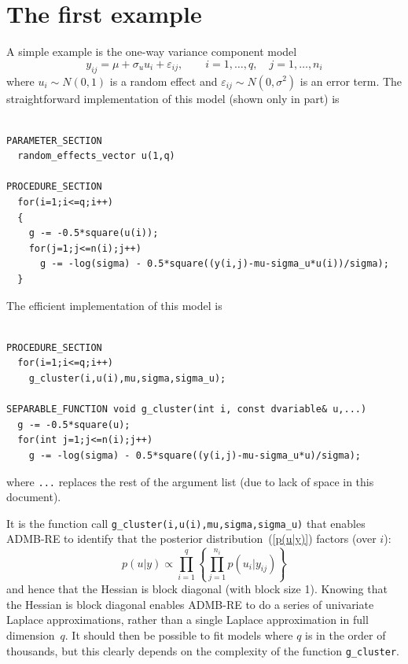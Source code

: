 \documentclass[12pt,letter,reqno]{book}
\begin{document}
\section{The first example}
A simple example is the one-way variance component model
\[
  y_{ij}=\mu +\sigma_u u_{i}+\varepsilon_{ij}, \qquad i=1,\ldots ,q,\quad j=1,\ldots ,n_{i}
\]
where $u_{i}\sim N(0,1)$ is a random effect and $\varepsilon_{ij}\sim N(0,\sigma^2)$ 
is an error term. The straightforward implementation of this model (shown only in part) is
\begin{lstlisting}

PARAMETER_SECTION
  random_effects_vector u(1,q)

PROCEDURE_SECTION
  for(i=1;i<=q;i++)
  {
    g -= -0.5*square(u(i));
    for(j=1;j<=n(i);j++)
      g -= -log(sigma) - 0.5*square((y(i,j)-mu-sigma_u*u(i))/sigma);
  }

\end{lstlisting}
The efficient implementation of this model is 
\begin{lstlisting}

PROCEDURE_SECTION
  for(i=1;i<=q;i++)
    g_cluster(i,u(i),mu,sigma,sigma_u);

SEPARABLE_FUNCTION void g_cluster(int i, const dvariable& u,...)
  g -= -0.5*square(u);
  for(int j=1;j<=n(i);j++)
    g -= -log(sigma) - 0.5*square((y(i,j)-mu-sigma_u*u)/sigma);

\end{lstlisting}
where \texttt{...} replaces the rest of the argument list (due to lack of space in this document).

It is the function call \texttt{g\_cluster(i,u(i),mu,sigma,sigma\_u)} that enables ADMB-RE to 
identify that the posterior distribution~(\ref{p(u|y)}) factors (over $i$):
\[  
  p(u|y) \propto \prod_{i=1}^{q}\left\{ \prod_{j=1}^{n_{i}}p(u_{i}|y_{ij})\right\} 
\]
and hence that the Hessian is  block diagonal (with block size 1).
Knowing that the Hessian is  block diagonal enables ADMB-RE to do a series of univariate
Laplace approximations, rather than a single Laplace approximation in full dimension~$q$. It should
then be possible to fit models where $q$ is in the order of thousands, but this clearly
depends on the complexity of the function \texttt{g\_cluster}.
\end{document}
